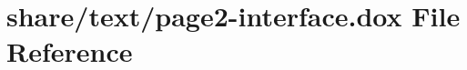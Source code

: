 \hypertarget{page2-interface_8dox}{\section{share/text/page2-\/interface.dox File Reference}
\label{page2-interface_8dox}
}
